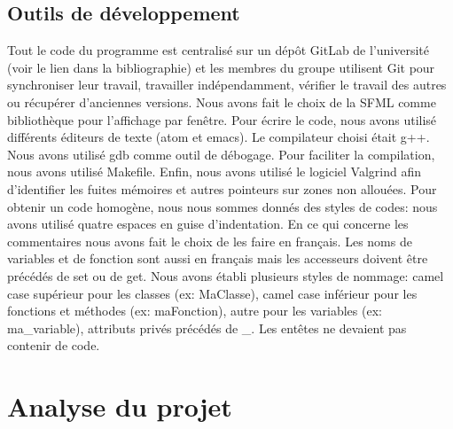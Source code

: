 \documentclass[french]{article}
\begin{document}
    \subsection{Outils de développement}
    
    \hspace{0.5cm} Tout le code du programme est centralisé sur un dépôt GitLab de l'université (voir le lien dans la bibliographie) et les membres du groupe utilisent Git pour synchroniser leur travail, travailler indépendamment, vérifier le travail des autres ou récupérer d’anciennes versions.
    Nous avons fait le choix de la SFML comme bibliothèque pour l'affichage par fenêtre. 
    Pour écrire le code, nous avons utilisé différents éditeurs de texte (atom et emacs). Le compilateur choisi était g++. Nous avons utilisé gdb comme outil de débogage. Pour faciliter la compilation, nous avons utilisé Makefile. Enfin, nous avons utilisé le logiciel Valgrind afin d'identifier les fuites mémoires et autres pointeurs sur zones non allouées. \newline
    Pour obtenir un code homogène, nous nous sommes donnés des styles de codes: nous avons utilisé quatre espaces en guise d'indentation. En ce qui concerne les commentaires nous avons fait le choix de les faire en français. Les noms de variables et de fonction sont aussi en français mais les accesseurs doivent être précédés de set ou de get. Nous avons établi plusieurs styles de nommage: camel case supérieur pour les classes (ex: MaClasse), camel case inférieur pour les fonctions et méthodes (ex: maFonction), autre pour les variables (ex: ma\_variable), attributs privés précédés de \_. Les entêtes ne devaient pas contenir de code. \newpage
\section{\LARGE Analyse du projet}
\end{document}
